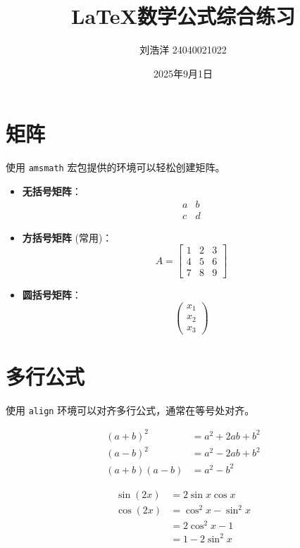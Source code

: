 \documentclass{article}
\title{LaTeX数学公式综合练习}
\author{刘浩洋 24040021022}
\date{2025年9月1日}
\begin{document}
\maketitle

\section{矩阵}
使用 \texttt{amsmath} 宏包提供的环境可以轻松创建矩阵。

\begin{itemize}
    \item \textbf{无括号矩阵}：
    \[
    \begin{matrix}
    a & b \\
    c & d 
    \end{matrix}
    \]
    \item \textbf{方括号矩阵} (常用)：
    \[
    A = \begin{bmatrix}
    1 & 2 & 3 \\
    4 & 5 & 6 \\
    7 & 8 & 9 
    \end{bmatrix}
    \]
    \item \textbf{圆括号矩阵}：
    \[
    \begin{pmatrix}
    x_1 \\
    x_2 \\
    x_3 
    \end{pmatrix}
    \]
\end{itemize}

\section{多行公式}
使用 \texttt{align} 环境可以对齐多行公式，通常在等号处对齐。

\begin{align}
(a + b)^2 &= a^2 + 2ab + b^2 \\
(a - b)^2 &= a^2 - 2ab + b^2 \\
(a + b)(a - b) &= a^2 - b^2
\end{align}

\begin{align*}
\sin(2x) &= 2\sin x \cos x \\
\cos(2x) &= \cos^2 x - \sin^2 x \\
&= 2\cos^2 x - 1 \\
&= 1 - 2\sin^2 x
\end{align*}
\end{document}
